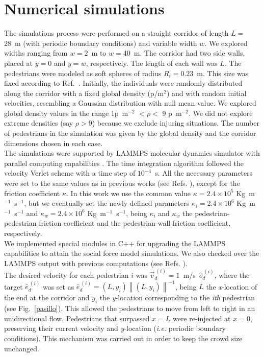 \section{\label{simulations}Numerical simulations}

The simulations process were performed on a straight corridor of length $L=$ 28~m (with periodic boundary conditions) and variable width $w$. We explored widths ranging from $w=2$~m to $w=40$~m. The corridor had two side walls, placed at $y=0$ and $y=w$, respectively. The length of each wall was $L$. The pedestrians were modeled as soft spheres of radius $R_i=0.23$~m. This size was fixed according to Ref.~\cite{metric_handbook}. Initially, the individuals were randomly distributed along the corridor with a fixed global density (p/m$^{2}$) and with random initial velocities, resembling a Gaussian distribution with null mean value. We explored global density values in the range 1p~m$^{-2}$ $<\rho<$ 9 p~m$^{-2}$. {\color{red} We did not explore extreme densities (say $\rho>9$) because we exclude injuring situations.} The number of pedestrians in the simulation was given by the global density and the corridor dimensions chosen in each case. \\

The simulations were supported by LAMMPS molecular dynamics simulator with parallel computing capabilities \cite{plimpton}.
The time integration algorithm followed the velocity Verlet scheme with a time step of $10^{-4}$~s. All the necessary parameters
were set to the same values as in previous works (see Refs. \cite{sticco,Dorso5}), except for the friction coefficient $\kappa$. In this work we use the common value $\kappa=2.4 \times 10^{5}$ Kg~m$^{-1}$~s$^{-1}$, but we eventually set the newly defined parameters $\kappa_i=2.4 \times 10^{6}$ Kg~m$^{-1}$~s$^{-1}$  and $\kappa_w=2.4 \times 10^{6}$ Kg~m$^{-1}$~s$^{-1}$, being $\kappa_i$ and $\kappa_w$ the pedestrian-pedestrian friction coefficient and the pedestrian-wall friction coefficient, respectively. \\

We implemented special modules in C++ for upgrading the LAMMPS capabilities to attain the social force model simulations. We also checked over the LAMMPS output with previous computations (see Refs. \cite{Dorso1, Dorso2,Dorso3, Dorso4,Dorso6}).\\

The desired velocity for each pedestrian $i$ was $\vec{v}_d^{~(i)}=1$~m/s~$\hat{e}_d^{~(i)}$, where the target $\hat{e}_d^{~(i)}$ was set as $\hat{e}_d^{~(i)}=(L,y_i)\left \| (L,y_i) \right \|^{-1}$, being $L$ the \textit{x}-location of the end at the corridor and $y_i$ the \textit{y}-location corresponding to the \textit{ith} pedestrian (see Fig.~\ref{pasillo}). This allowed the pedestrians to move from left to right in an unidirectional flow. Pedestrians that surpassed $x=L$ were re-injected at $x=0$, preserving their current velocity and \textit{y}-location (\textit{i.e.} periodic boundary conditions). This mechanism was carried out in order to keep
the crowd size unchanged.\\

